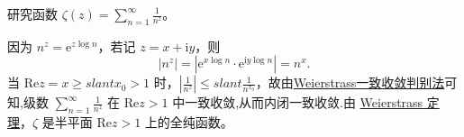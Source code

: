 \documentclass[../../main.tex]{subfiles}
\begin{document}
\begin{example}
研究函数 \( \zeta(z) = \sum_{n=1}^{\infty} \frac{1}{n^z} \)。
\end{example}
\begin{solution}
因为 \( n^z = \mathrm{e}^{z \log n} \)，若记 \( z = x + \mathrm{i}y \)，则
\[
|n^z| = |\mathrm{e}^{x \log n} \cdot \mathrm{e}^{\mathrm{i}y \log n}| = n^x.
\]
当 \( \mathrm{Re}z = x \geqslant slant x_0 > 1 \) 时，\( \left| \frac{1}{n^z} \right| \leqslant slant \frac{1}{n^{x_0}} \)，故由\hyperref[theorem:Weierstrass一致收敛判别法]{Weierstrass一致收敛判别法}可知,级数 \( \sum_{n=1}^{\infty} \frac{1}{n^z} \) 在 \( \mathrm{Re}z > 1 \) 中一致收敛,从而内闭一致收敛.由 \hyperref[theorem:Weierstrass定理]{Weierstrass 定理}，\( \zeta \) 是半平面 \( \mathrm{Re}z > 1 \) 上的全纯函数。
\end{solution}
\end{document}
